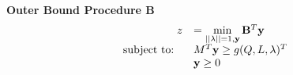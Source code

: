 \textbf{Outer Bound Procedure B} 
\begin{equation}\label{eq:OPTfeasOutRelaxb}
\begin{array}{rl}
\ z &=\min\limits_{||\lambda||=1, \mathbf{y}}\mathbf{B}^T\mathbf{y}  \\
 \text{subject to: } \ & M^T\mathbf{y} \geq g(Q,L,\lambda)^T \\
 & \mathbf{y}\geq 0
\end{array}
\end{equation}










